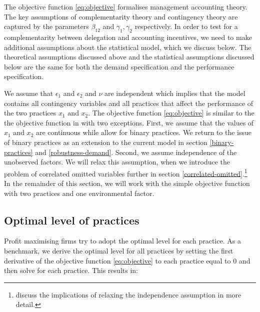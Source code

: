 \documentclass[12pt]{article}
\begin{document}
The objective function \eqref{eq:objective} formalises management accounting theory. The key assumptions of complementarity theory and contingency theory are captured by the parameters $\beta_{12}$ and $\gamma_1, \gamma_2$ respectively. In order to test for a complementarity between delegation and accounting incentives, we need to make additional assumptions about the statistical model, which we discuss below. The theoretical assumptions discussed above and the statistical assumptions discussed below are the same for both the demand specification and the performance specification.

We assume that $\epsilon_1$ and $\epsilon_2$ and $\nu$ are independent which implies that the model contains all contingency variables and all practices that affect the performance of the two practices $x_1$ and $x_2$. The objective function \eqref{eq:objective} is similar to the the objective function in \citet{kretschmer_competitive_2012} with two exceptions. First, we assume that the values of $x_1$ and $x_2$ are continuous while \citet{kretschmer_competitive_2012} allow for binary practices. We return to the issue of binary practices as an extension to the current model in section \ref{binary-practices} and \ref{robustness-demand}. Second, we assume independence of the unobserved factors. We will relax this assumption, when we introduce the problem of correlated omitted variables further in section \ref{correlated-omitted}.\footnote{\citet{athey_empirical_1998} discuss the implications of relaxing the independence assumption in more detail.}  In the remainder of this section, we will work with the simple objective function with two practices and one environmental factor. 

\subsection{Optimal level of practices} \label{optimal-level-of-practices}

Profit maximising firms try to adopt the optimal level for each practice. As a benchmark, we derive the optimal level for all practices by setting the first derivative of the objective function \eqref{eq:objective} to each practice equal to $0$ and then solve for each practice. This results in:
\end{document}
